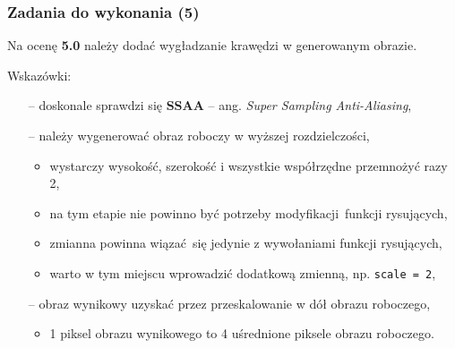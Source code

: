 \documentclass[usenames,dvipsnames,aspectratio=43,presentation]{beamer}
\begin{document}
    \begin{frame}
        \frametitle{Zadania do wykonania (5)}
        \footnotesize

        Na ocenę \textbf{5.0} należy dodać wygładzanie krawędzi w generowanym obrazie.

        \vfill

        Wskazówki:
        \begin{itemize}
            \setlength{\itemsep}{0.5em}
            \item[--] doskonale sprawdzi się \textbf{SSAA} – ang. \textit{Super Sampling Anti-Aliasing},
            \item[--] należy wygenerować obraz roboczy w wyższej rozdzielczości,
                      \begin{itemize}
                          \scriptsize
                          \item wystarczy wysokość, szerokość i wszystkie współrzędne przemnożyć razy 2,
                          \item na tym etapie nie powinno być potrzeby modyfikacji funkcji rysujących,
                          \item zmianna powinna wiązać się jedynie z wywołaniami funkcji rysujących,
                          \item warto w tym miejscu wprowadzić dodatkową zmienną, np. \texttt{scale = 2},
                      \end{itemize}
            \item[--] obraz wynikowy uzyskać przez przeskalowanie w dół obrazu roboczego,
                      \begin{itemize}
                          \scriptsize
                          \item 1 piksel obrazu wynikowego to 4 uśrednione piksele obrazu roboczego.
                      \end{itemize}
        \end{itemize}
    \end{frame}
\end{document}
